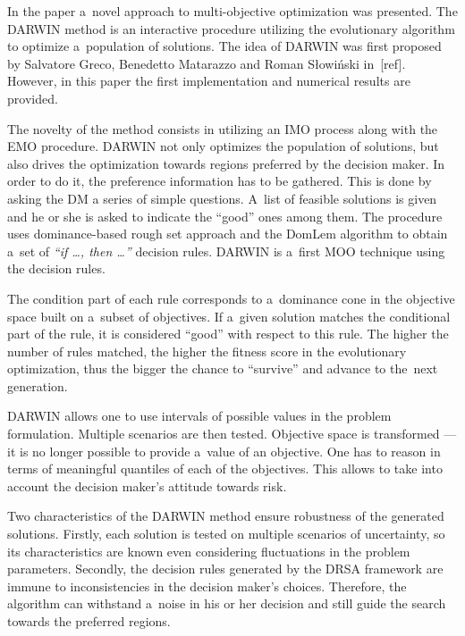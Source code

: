 In the paper a~novel approach to multi-objective optimization was
presented. The DARWIN method is an interactive procedure utilizing the
evolutionary algorithm to optimize a~population of solutions. The idea of
DARWIN was first proposed by Salvatore Greco, Benedetto Matarazzo and Roman
Słowiński in~[ref]. However, in this paper the first implementation and
numerical results are provided.

The novelty of the method consists in utilizing an IMO process along with the
EMO procedure. DARWIN not only optimizes the population of solutions, but also
drives the optimization towards regions preferred by the decision maker. In
order to do it, the preference information has to be gathered. This is done by
asking the DM a series of simple questions. A~list of feasible solutions is
given and he or she is asked to indicate the ``good'' ones among them. The
procedure uses dominance-based rough set approach and the DomLem algorithm to
obtain a~set of \textit{``if \dots, then \dots''} decision rules. DARWIN is
a~first MOO technique using the decision rules.

The condition part of each rule corresponds to a~dominance cone in the
objective space built on a~subset of objectives. If a~given solution matches
the conditional part of the rule, it is considered ``good'' with respect to
this rule. The higher the number of rules matched, the higher the fitness
score in the evolutionary optimization, thus the bigger the chance to
``survive'' and advance to the~next generation.

DARWIN allows one to use intervals of possible values in the problem
formulation. Multiple scenarios are then tested. Objective space is
transformed --- it is no longer possible to provide a~value of an
objective. One has to reason in terms of meaningful quantiles of each of the
objectives. This allows to take into account the decision maker's attitude
towards risk.

Two characteristics of the DARWIN method ensure robustness of the generated
solutions. Firstly, each solution is tested on multiple scenarios of
uncertainty, so its characteristics are known even considering fluctuations in
the problem parameters. Secondly, the decision rules generated by the DRSA
framework are immune to inconsistencies in the decision maker's
choices. Therefore, the algorithm can withstand a~noise in his or her decision
and still guide the search towards the preferred regions.

